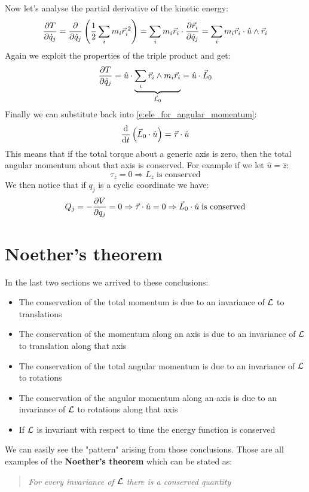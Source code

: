 Now let's analyse the partial derivative of the kinetic energy:
\begin{equation}
    \pdv{T}{\dot{q}_j} = \pdv{}{\dot{q}_j}\brackets{\dfrac{1}{2}\bigsum_i m_i \vec{r}_i^{\;2}} = \bigsum_i m_i \vec{r}_i \cdot \pdv{\vec{r}_i}{\dot{q}_j} = \bigsum_i m_i \vec{r}_i \cdot \hat{u} \wedge \vec{r}_i
\end{equation}
Again we exploit the properties of the triple product and get:
\begin{equation}
    \pdv{T}{\dot{q}_j} =   \hat{u} \cdot \underbrace{\bigsum_i \vec{r}_i \wedge m_i \vec{r}_i}_{\vec{L}_0} = \hat{u} \cdot \vec{L}_0
\end{equation}
Finally we can substitute back into \eqref{e:ele_for_angular_momentum}:
\begin{equation}
    \dv{}{t}\brackets{\vec{L}_0 \cdot \hat{u}} = \vec{\tau} \cdot \hat{u}
\end{equation}
This means that if the total torque about a generic axis is zero, then the total angular momentum about that axis is conserved. For example if we let $\hat{u} = \hat{z}$:
\begin{equation}
    \tau_z = 0 \Rightarrow L_z\;\text{is conserved}
\end{equation}
We then notice that if $q_j$ is a cyclic coordinate we have:
\begin{equation}
    Q_j = -\pdv{V}{q_j} = 0 \Rightarrow \vec{\tau} \cdot \hat{u} = 0 \Rightarrow \vec{L}_0 \cdot \hat{u}\;\text{is conserved}
\end{equation}
\section{Noether's theorem}
In the last two sections we arrived to these conclusions:
\begin{itemize}
    \item The conservation of the total momentum is due to an invariance of $\mathcal{L}$ to translations
    \item The conservation of the momentum along an axis is due to an invariance of $\mathcal{L}$ to translation along that axis
    \item The conservation of the total angular momentum is due to an invariance of $\mathcal{L}$ to rotations
    \item The conservation of the angular momentum along an axis is due to an invariance of $\mathcal{L}$ to rotations along that axis
    \item If $\mathcal{L}$ is invariant with respect to time the energy function is conserved
\end{itemize}
We can easily see the "pattern" arising from those conclusions. Those are all examples of the \textbf{Noether's theorem} which can be stated as:
\begin{quotation}
    \textit{For every invariance of $\mathcal{L}$ there is a conserved quantity}
\end{quotation}
